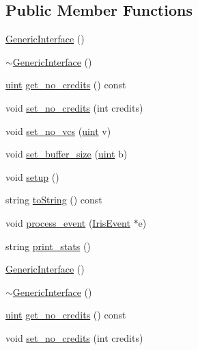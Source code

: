 \subsection*{Public Member Functions}
\begin{CompactItemize}
\item 
\hyperlink{classGenericInterface_6614ccfa832a38b9cd2087f28527fa57}{GenericInterface} ()
\item 
\hyperlink{classGenericInterface_8543b504083542c36dc7f11e00895390}{$\sim$GenericInterface} ()
\item 
\hyperlink{outputBuffer_8h_91ad9478d81a7aaf2593e8d9c3d06a14}{uint} \hyperlink{classGenericInterface_82a7ead764982a93e658ce41d198cc69}{get\_\-no\_\-credits} () const 
\item 
void \hyperlink{classGenericInterface_d4d5041bce12cd013a77f476c039c391}{set\_\-no\_\-credits} (int credits)
\item 
void \hyperlink{classGenericInterface_10e019a3cafe243d63587656afc5e79f}{set\_\-no\_\-vcs} (\hyperlink{outputBuffer_8h_91ad9478d81a7aaf2593e8d9c3d06a14}{uint} v)
\item 
void \hyperlink{classGenericInterface_fd1cd1ccd6d355852bee1677cd8b56df}{set\_\-buffer\_\-size} (\hyperlink{outputBuffer_8h_91ad9478d81a7aaf2593e8d9c3d06a14}{uint} b)
\item 
void \hyperlink{classGenericInterface_1aaf2e40e433e913e7ea9cb68693fa7c}{setup} ()
\item 
string \hyperlink{classGenericInterface_ae1400fce0c7ba48965596ec172e474b}{toString} () const 
\item 
void \hyperlink{classGenericInterface_d56b8876204889d3c096fccd61b16b9e}{process\_\-event} (\hyperlink{classIrisEvent}{IrisEvent} $\ast$e)
\item 
string \hyperlink{classGenericInterface_b1be26f08d69932b1ac08094985eb5d6}{print\_\-stats} ()
\item 
\hyperlink{classGenericInterface_6614ccfa832a38b9cd2087f28527fa57}{GenericInterface} ()
\item 
\hyperlink{classGenericInterface_8543b504083542c36dc7f11e00895390}{$\sim$GenericInterface} ()
\item 
\hyperlink{outputBuffer_8h_91ad9478d81a7aaf2593e8d9c3d06a14}{uint} \hyperlink{classGenericInterface_82a7ead764982a93e658ce41d198cc69}{get\_\-no\_\-credits} () const 
\item 
void \hyperlink{classGenericInterface_d4d5041bce12cd013a77f476c039c391}{set\_\-no\_\-credits} (int credits)
\item 

\end{CompactItemize}
